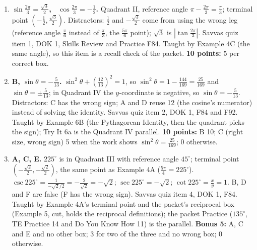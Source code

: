 \documentclass[11pt]{article}
\begin{document}
{\raggedright
\begin{enumerate}
\item[\textbf{1.}] \textbf{$\sin\frac{2\pi}{3}=\frac{\sqrt3}{2}$, \ $\cos\frac{2\pi}{3}=-\frac12$.} Quadrant II, reference angle $\pi-\frac{2\pi}{3}=\frac\pi3$; terminal point $\left(-\frac12,\frac{\sqrt3}{2}\right)$. Distractors: $\frac12$ and $-\frac{\sqrt3}{2}$ come from using the wrong leg (reference angle $\frac\pi6$ instead of $\frac\pi3$, the $\frac{5\pi}{6}$ point); $\sqrt3$ is $|\tan\frac{2\pi}{3}|$. Savvas quiz item 1, DOK 1, Skills Review and Practice F84. Taught by Example 4C (the same angle), so this item is a recall check of the packet. \textbf{10 points:} 5 per correct box.
\item[\textbf{2.}] \textbf{B, $\sin\theta=-\frac5{13}$.} $\sin^2\theta+\left(\frac{12}{13}\right)^2=1$, so $\sin^2\theta=1-\frac{144}{169}=\frac{25}{169}$ and $\sin\theta=\pm\frac5{13}$; in Quadrant IV the $y$-coordinate is negative, so $\sin\theta=-\frac5{13}$. Distractors: C has the wrong sign; A and D reuse 12 (the cosine's numerator) instead of solving the identity. Savvas quiz item 2, DOK 1, F84 and F92. Taught by Example 6B (the Pythagorean Identity, then the quadrant picks the sign); Try It 6a is the Quadrant IV parallel. \textbf{10 points:} B 10; C (right size, wrong sign) 5 when the work shows $\sin^2\theta=\frac{25}{169}$; 0 otherwise.
\item[\textbf{4.}] \textbf{A, C, E.} $225^\circ$ is in Quadrant III with reference angle $45^\circ$; terminal point $\left(-\frac{\sqrt2}{2},-\frac{\sqrt2}{2}\right)$, the same point as Example 4A ($\frac{5\pi}{4}=225^\circ$). \mbox{$\csc225^\circ=\frac{1}{-\sqrt2/2}=-\frac{2}{\sqrt2}=-\sqrt2$}; $\sec225^\circ=-\sqrt2$; $\cot225^\circ=\frac{x}{y}=1$. B, D and F are false (F has the wrong sign). Savvas quiz item 4, DOK 1, F84. Taught by Example 4A's terminal point and the packet's reciprocal box (Example 5, cut, holds the reciprocal definitions); the packet Practice ($135^\circ$, TE Practice 14 and Do You Know How 11) is the parallel. \textbf{Bonus 5:} A, C and E and no other box; 3 for two of the three and no wrong box; 0 otherwise.
\end{enumerate}
}
\end{document}
